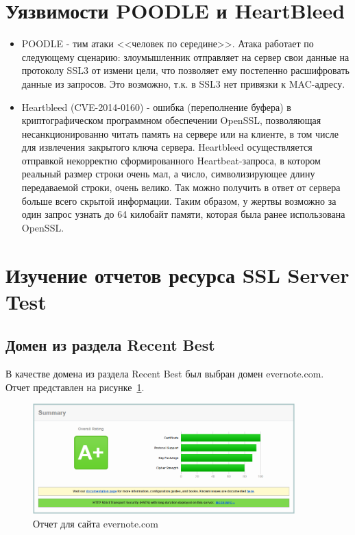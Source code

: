\documentclass[10pt,a4paper]{report}
\begin{document}
	\section{Уязвимости POODLE и HeartBleed}
		\begin{itemize}
			\item POODLE - тим атаки <<человек по середине>>.
			Атака работает по следующему сценарию: злоумышленник отправляет на сервер 
			свои данные на протоколу SSL3 от измени цели, что позволяет ему 
			постепенно расшифровать данные из запросов.
			Это возможно, т.к. в SSL3 нет привязки к MAC-адресу.
			
			\item Heartbleed (CVE-2014-0160) - ошибка (переполнение буфера) в 
			криптографическом программном обеспечении OpenSSL, позволяющая 
			несанкционированно читать память на сервере или на клиенте, в том числе 
			для извлечения закрытого ключа сервера. 
			Heartbleed осуществляется отправкой некорректно сформированного 
			Heartbeat-запроса, в котором реальный размер строки очень мал, а число, 
			символизирующее длину передаваемой строки, очень велико.
			Так можно получить в ответ от сервера больше всего скрытой информации.
			Таким образом, у жертвы возможно за один запрос узнать до 64 килобайт 
			памяти, которая была ранее использована OpenSSL.
		\end{itemize}
	
	\section{Изучение отчетов ресурса SSL Server Test}
		\subsection{Домен из раздела Recent Best}
			В качестве домена из раздела Recent Best был выбран домен evernote.com.
			Отчет представлен на рисунке~\ref{ris:evernote}.
			
			\begin{figure}[h]
				\centering
				\includegraphics[width=0.9\textwidth]{res/evernote}
				\caption{Отчет для сайта evernote.com}
				\label{ris:evernote}
			\end{figure}
			
\end{document}
